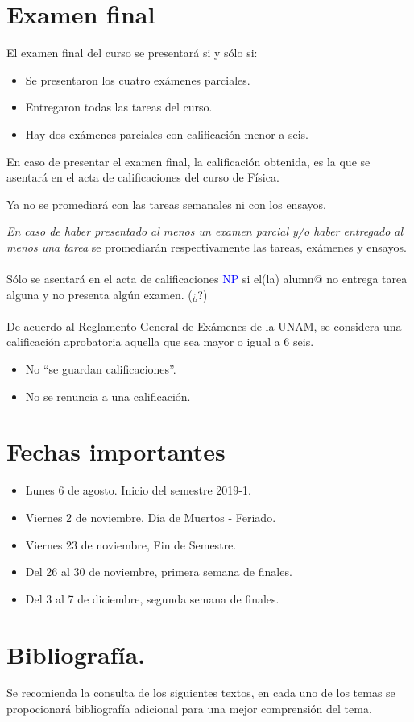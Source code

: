\documentclass[12pt]{article}
\begin{document}
\section{Examen final}
El examen final del curso se presentará si y sólo si:
\begin{itemize}
\item Se presentaron los cuatro exámenes parciales.
\item Entregaron todas las tareas del curso.
\item Hay dos exámenes parciales con calificación menor a seis.
\end{itemize}
En caso de presentar el examen final, la calificación obtenida, es la que se asentará en el acta de calificaciones del curso de Física.
\par
Ya no se promediará con las tareas semanales ni con los ensayos.
\par
\emph{En caso de haber presentado al menos un examen parcial y/o haber entregado al menos una tarea} se promediarán respectivamente las tareas, exámenes y ensayos.
\\
\\
Sólo se asentará en el acta de calificaciones \textcolor{blue}{NP} si el(la) alumn{@} no entrega tarea alguna y no presenta algún examen. (¿?)
\\
\\
De acuerdo al Reglamento General de Exámenes de la UNAM, se considera una calificación aprobatoria aquella que sea mayor o igual a $6$ seis.
\begin{itemize}
\item No \enquote{se guardan calificaciones}.
\item No se renuncia a una calificación.
\end{itemize}
\section{Fechas importantes}
\begin{itemize}
\item Lunes 6 de agosto. Inicio del semestre 2019-1.
\item Viernes 2 de noviembre. Día de Muertos - Feriado.
\item Viernes 23 de noviembre, Fin de Semestre.
\item Del 26 al 30 de noviembre, primera semana de finales.
\item Del 3 al 7 de diciembre,  segunda semana de finales.
\end{itemize}
\newpage
\section{Bibliografía.}
Se recomienda la consulta de los siguientes textos, en cada uno de los temas se propocionará bibliografía adicional para una mejor comprensión del tema.
\nocite{*}


\end{document}
